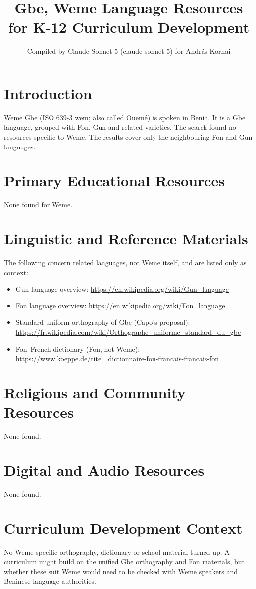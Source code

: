 \documentclass[12pt]{article}
\title{Gbe, Weme Language Resources for K-12 Curriculum Development}
\author{Compiled by Claude Sonnet 5 (claude-sonnet-5) for Andr\'as Kornai}
\date{}
\begin{document}
\maketitle
\section{Introduction}
Weme Gbe (ISO 639-3 wem; also called Ouem\'e) is spoken in Benin. It is a Gbe language, grouped with Fon, Gun and related varieties. The search found no resources specific to Weme. The results cover only the neighbouring Fon and Gun languages.
\section{Primary Educational Resources}
None found for Weme.
\section{Linguistic and Reference Materials}
The following concern related languages, not Weme itself, and are listed only as context:
\begin{itemize}
\item Gun language overview: \url{https://en.wikipedia.org/wiki/Gun_language}
\item Fon language overview: \url{https://en.wikipedia.org/wiki/Fon_language}
\item Standard uniform orthography of Gbe (Capo's proposal): \url{https://fr.wikipedia.com/wiki/Orthographe_uniforme_standard_du_gbe}
\item Fon--French dictionary (Fon, not Weme): \url{https://www.koeppe.de/titel_dictionnaire-fon-francais-francais-fon}
\end{itemize}
\section{Religious and Community Resources}
None found.
\section{Digital and Audio Resources}
None found.
\section{Curriculum Development Context}
No Weme-specific orthography, dictionary or school material turned up. A curriculum might build on the unified Gbe orthography and Fon materials, but whether these suit Weme would need to be checked with Weme speakers and Beninese language authorities.
\end{document}
